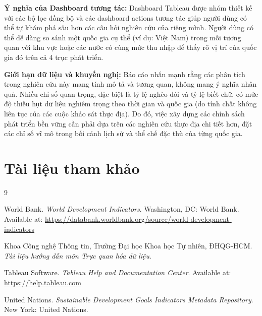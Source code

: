 \textbf{Ý nghĩa của Dashboard tương tác:} Dashboard Tableau được nhóm thiết kế với các bộ lọc đồng bộ và các dashboard actions tương tác giúp người dùng có thể tự khám phá sâu hơn các câu hỏi nghiên cứu của riêng mình. Người dùng có thể dễ dàng so sánh một quốc gia cụ thể (ví dụ: Việt Nam) trong mối tương quan với khu vực hoặc các nước có cùng mức thu nhập để thấy rõ vị trí của quốc gia đó trên cả 4 trục phát triển.

\textbf{Giới hạn dữ liệu và khuyến nghị:} Báo cáo nhấn mạnh rằng các phân tích trong nghiên cứu này mang tính mô tả và tương quan, không mang ý nghĩa nhân quả. Nhiều chỉ số quan trọng, đặc biệt là tỷ lệ nghèo đói và tỷ lệ biết chữ, có mức độ thiếu hụt dữ liệu nghiêm trọng theo thời gian và quốc gia (do tính chất không liên tục của các cuộc khảo sát thực địa). Do đó, việc xây dựng các chính sách phát triển bền vững cần phải dựa trên các nghiên cứu thực địa chi tiết hơn, đặt các chỉ số vĩ mô trong bối cảnh lịch sử và thể chế đặc thù của từng quốc gia.

\section*{Tài liệu tham khảo}

\begin{thebibliography}{9}

World Bank. \textit{World Development Indicators}. Washington, DC: World Bank. Available at: \url{https://databank.worldbank.org/source/world-development-indicators}

Khoa Công nghệ Thông tin, Trường Đại học Khoa học Tự nhiên, ĐHQG-HCM. \textit{Tài liệu hướng dẫn môn Trực quan hóa dữ liệu}.

Tableau Software. \textit{Tableau Help and Documentation Center}. Available at: \url{https://help.tableau.com}

United Nations. \textit{Sustainable Development Goals Indicators Metadata Repository}. New York: United Nations.

\end{thebibliography}
